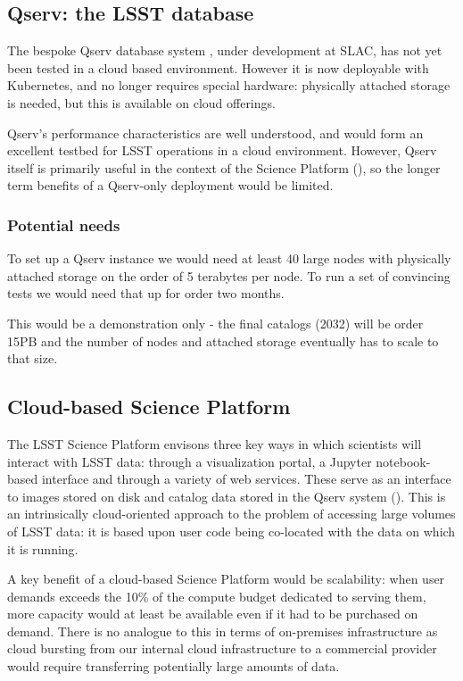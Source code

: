 \subsection{Qserv: the LSST database}\label{sect:qserv}

The bespoke Qserv database system , under development at SLAC, has not yet been tested in a cloud based environment.
However it is now deployable with Kubernetes, and no longer requires special hardware: physically attached storage is needed, but this is available on cloud offerings.

Qserv's performance characteristics are well understood, and would form an excellent testbed for LSST operations in a cloud environment.
However, Qserv itself is primarily useful in the context of the Science Platform (), so the longer term benefits of a Qserv-only deployment would be limited.

\subsubsection{Potential needs} \label{sect:qservneeds}

To set up a Qserv instance we would need at least 40 large nodes with physically attached storage on the order of 5 terabytes per node.
To run a set of convincing tests we would need that up for order two months.

This would be a  demonstration only - the final catalogs (2032) will be order 15PB and the number of nodes and attached storage eventually has to scale to that size.

\subsection{Cloud-based Science Platform} \label{sect:platform}

The LSST Science Platform  envisons three key ways in which scientists will interact with LSST data: through a visualization portal, a Jupyter notebook-based interface and through a variety of web services.
These serve as an interface to images stored on disk and catalog data stored in the Qserv system ().
This is an intrinsically cloud-oriented approach to the problem of accessing large volumes of LSST data: it is based upon user code being co-located with the data on which it is running.

A key benefit of a cloud-based Science Platform would be scalability: when user demands exceeds the 10\% of the compute budget dedicated to serving them, more capacity would at least be available even if it had to be purchased on demand.
There is no analogue to this in terms of on-premises infrastructure as cloud bursting from our internal cloud infrastructure to a commercial provider would require transferring potentially large amounts of data.

